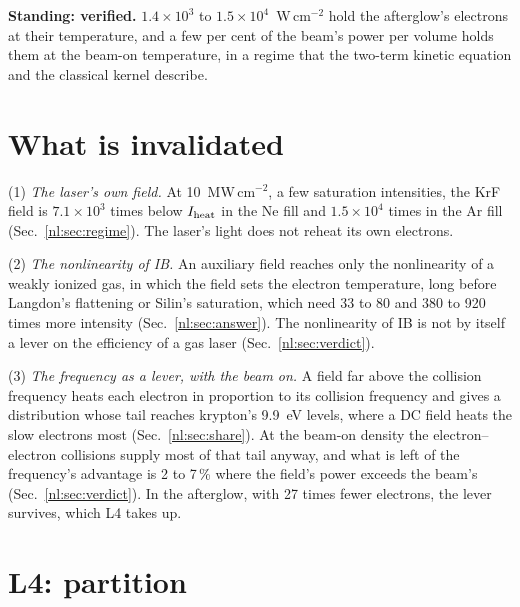 \medskip
\noindent\textbf{Standing: verified.} $1.4\times10^{3}$ to
$1.5\times10^{4}$~W\,cm$^{-2}$ hold the afterglow's electrons at their temperature, and
a few per cent of the beam's power per volume holds them at the beam-on temperature, in
a regime that the two-term kinetic equation and the classical kernel describe.

\section{What is invalidated}
\label{p1:sec:invalid}

{\noindent}(1) \emph{The laser's own field.} At 10~MW\,cm$^{-2}$, a few saturation
intensities, the KrF field is $7.1\times10^{3}$ times below $I_{\rm heat}$ in the Ne
fill and $1.5\times10^{4}$ times in the Ar fill (Sec.~\ref{nl:sec:regime}). The laser's
light does not reheat its own electrons.

{\noindent}(2) \emph{The nonlinearity of IB.} An auxiliary field reaches only the
nonlinearity of a weakly ionized gas, in which the field sets the electron temperature,
long before Langdon's flattening \cite{p1:Langdon1980} or Silin's saturation, which need
33 to 80 and 380 to 920 times more intensity (Sec.~\ref{nl:sec:answer}). The
nonlinearity of IB is not by itself a lever on the efficiency of a gas laser
(Sec.~\ref{nl:sec:verdict}).

{\noindent}(3) \emph{The frequency as a lever, with the beam on.} A field far above the
collision frequency heats each electron in proportion to its collision frequency and
gives a distribution whose tail reaches krypton's 9.9~eV levels, where a DC field heats
the slow electrons most (Sec.~\ref{nl:sec:share}). At the beam-on density the
electron--electron collisions supply most of that tail anyway, and what is left of the
frequency's advantage is 2 to 7\,\% where the field's power exceeds the beam's
(Sec.~\ref{nl:sec:verdict}). In the afterglow, with 27 times fewer electrons, the lever
survives, which L4 takes up.

\section{L4: partition}
\label{p1:sec:L4}

